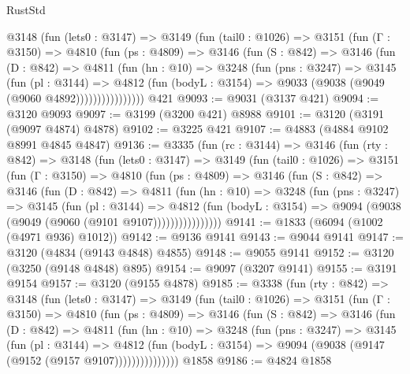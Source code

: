 \begin{lexlean}{RustStd}
\begin{coremodule}
        @3148
          (fun (lets0 : @3147) =>
          @3149
            (fun (tail0 : @1026) =>
            @3151
              (fun (Γ : @3150) =>
              @4810
                (fun (ps : @4809) =>
                @3146
                  (fun (S : @842) =>
                  @3146
                    (fun (D : @842) =>
                    @4811
                      (fun (hn : @10) =>
                      @3248
                        (fun (pns : @3247) =>
                        @3145
                          (fun (pl : @3144) =>
                          @4812
                            (fun (bodyL : @3154) => @9033 (@9038 (@9049 (@9060 @4892))))))))))))))))
    @421
@9093 := @9031 (@3137 @421)
@9094 := @3120 @9093
@9097 := @3199 (@3200 @421) @8988
@9101 := @3120 (@3191 (@9097 @4874) @4878)
@9102 := @3225 @421
@9107 := @4883 (@4884 @9102 @8991 @4845 @4847)
@9136 := @3335
    (fun (rc : @3144) =>
    @3146
      (fun (rty : @842) =>
      @3148
        (fun (lets0 : @3147) =>
        @3149
          (fun (tail0 : @1026) =>
          @3151
            (fun (Γ : @3150) =>
            @4810
              (fun (ps : @4809) =>
              @3146
                (fun (S : @842) =>
                @3146
                  (fun (D : @842) =>
                  @4811
                    (fun (hn : @10) =>
                    @3248
                      (fun (pns : @3247) =>
                      @3145
                        (fun (pl : @3144) =>
                        @4812
                          (fun (bodyL : @3154) =>
                          @9094 (@9038 (@9049 (@9060 (@9101 @9107))))))))))))))))
@9141 := @1833 (@6094 (@1002 (@4971 @936) @1012))
@9142 := @9136 @9141
@9143 := @9044 @9141
@9147 := @3120 (@4834 (@9143 @4848) @4855)
@9148 := @9055 @9141
@9152 := @3120 (@3250 (@9148 @4848) @895)
@9154 := @9097 (@3207 @9141)
@9155 := @3191 @9154
@9157 := @3120 (@9155 @4878)
@9185 := @3338
    (fun (rty : @842) =>
    @3148
      (fun (lets0 : @3147) =>
      @3149
        (fun (tail0 : @1026) =>
        @3151
          (fun (Γ : @3150) =>
          @4810
            (fun (ps : @4809) =>
            @3146
              (fun (S : @842) =>
              @3146
                (fun (D : @842) =>
                @4811
                  (fun (hn : @10) =>
                  @3248
                    (fun (pns : @3247) =>
                    @3145
                      (fun (pl : @3144) =>
                      @4812
                        (fun (bodyL : @3154) =>
                        @9094 (@9038 (@9147 (@9152 (@9157 @9107)))))))))))))))
    @1858
@9186 := @4824 @1858

\end{coremodule}
\end{lexlean}
